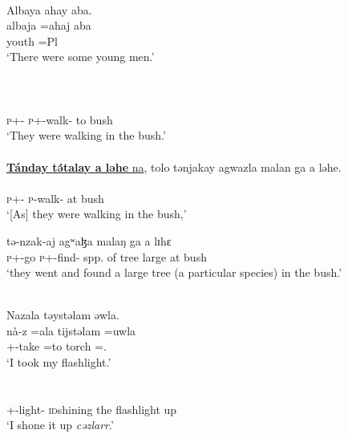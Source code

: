 \ea \label{ex:11:23}
\\
Albaya  ahay  aba.\\   
\gll  albaja  =ahaj  aba   \\
      youth   =Pl  {\EXT} \\
\glt ‘There were some young men.’\\ 

\medskip
{}\\ \\
\\
      \textsc{p}+{\IFV}-{\PRG} \textsc{p}+{\IFV}-walk-{\CL}  to  bush\\
\glt  ‘They were walking in the bush.’\\

\medskip
{}\\
\underline{\textbf{Tánday  t\'ətalay  a  ləhe} na},  tolo  tənjakay  agwazla  malan  ga  a  ləhe.\\
\gll  {}    \\ 
      \textsc{p}+{\IFV}-{\PRG} \textsc{p}-walk-{\CL}  at bush {\PSP}\\ 
\glt ‘[As] they were walking in the bush,’ \\     
      
      \medskip
      
 {tə-nzak-aj} {agʷaɮa} {malaŋ} {ga} {a} {lɪhɛ}\\
     \textsc{p}+{\PFV}-go  \textsc{p}+{\PFV}-find{}-{\CL}  {spp. of tree}  large {\ADJ}      at  bush\\
\glt  ‘they went and found a large tree (a particular species) in the bush.’
\z

\ea \label{ex:11:24}\\
Nazala  təystəlam  əwla.\\    
\gll  nà-z =ala  tijstəlam   =uwla  \\  
      {\oneS}+{\PFV}-take =to  torch   ={\oneS}.{\POSS} \\  
\glt ‘I took my flashlight.’\\

      \\      
\\
     {\oneS}+{\PFV}-light{}-{\CL}  {\textsc{id}shining the flashlight up}\\
\glt  ‘I shone it up \textit{cəzlarr}.’\\

